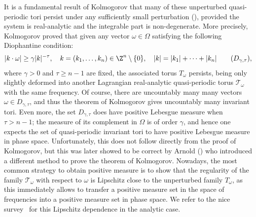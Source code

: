 It is a fundamental result of Kolmogorov that many of these unperturbed quasi-periodic tori persist under any sufficiently small perturbation (\cite{Kol54}), provided the system is real-analytic and the integrable part is non-degenerate. More precisely, Kolmogorov proved that given any vector $\omega \in \Omega$ satisfying the following Diophantine condition:
\begin{equation}\label{dioph}
|k\cdot \omega| \geq \gamma |k|^{-\tau}, \quad k=(k_1,\dots,k_n) \in \Z^n\setminus\{0\}, \quad |k|=|k_1|+\cdots+|k_n| \tag{$D_{\gamma,\tau}$},
\end{equation}
where $\gamma>0$ and $\tau \geq n-1$ are fixed, the associated torus $T_{\omega}$ persists, being only slightly deformed into another Lagrangian real-analytic quasi-periodic torus $\mathcal{T}_\omega$ with the same frequency. Of course, there are uncountably many many vectors $\omega \in D_{\gamma,\tau}$, and thus the theorem of Kolmogorov gives uncountably many invariant tori. Even more, the set $D_{\gamma,\tau}$ does have positive Lebesgue measure when $\tau>n-1$; the measure of its complement in $\Omega$ is of order $\gamma$, and hence one expects the set of quasi-periodic invariant tori to have positive Lebesgue measure in phase space. Unfortunately, this does not follow directly from the proof of Kolmogorov, but this was later showed to be correct by Arnold (\cite{Arn63a}) who introduced a different method to prove the theorem of Kolmogorov. Nowadays, the most common strategy to obtain positive measure is to show that the regularity of the family $\mathcal{T}_\omega$ with respect to $\omega$ is Lipschitz close to the unperturbed family $T_\omega$, as this immediately allows to transfer a positive measure set in the space of frequencies into a positive measure set in phase space. We refer to the nice survey~\cite{Pos01} for this Lipschitz dependence in the analytic case.

